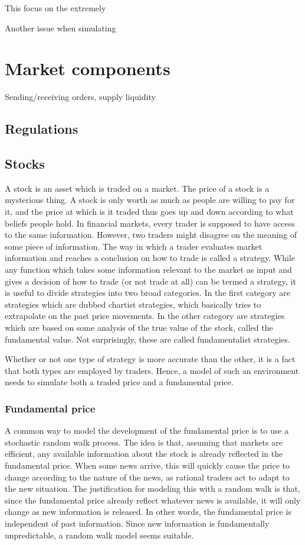 This focus on the extremely 

Another issue when simulating 





\section{Market components}
Sending/receiving orders, supply liquidity
\subsection{Regulations}

\subsection{Stocks}
A stock is an asset which is traded on a market. The price of a stock is a mysterious thing. A stock is only worth as much as people are willing to pay for it, and the price at which is it traded thus goes up and down according to what beliefs people hold. In financial markets, every trader is supposed to have access to the same information. However, two traders might disagree on the meaning of some piece of information. The way in which a trader evaluates market information and reaches a conclusion on how to trade is called a strategy. While any function which takes some information relevant to the market as input and gives a decision of how to trade (or not trade at all) can be termed a strategy, it is useful to divide strategies into two broad categories. In the first category are strategies which are dubbed chartist strategies, which basically tries to extrapolate on the past price movements. In the other category are strategies which are based on some analysis of the true value of the stock, called the fundamental value. Not surprisingly, these are called fundamentalist strategies. 

Whether or not one type of strategy is more accurate than the other, it is a fact that both types are employed by traders. Hence, a model of such an environment needs to simulate both a traded price and a fundamental price. 

\subsubsection{Fundamental price}

A common way to model the development of the fundamental price is to use a stochastic random walk process. The idea is that, assuming that markets are efficient, any available information about the stock is already reflected in the fundamental price. When some news arrive, this will quickly cause the price to change according to the nature of the news, as rational traders act to adapt to the new situation. The justification for modeling this with a random walk is that, since the fundamental price already reflect whatever news is available, it will only change as new information is released. In other words, the fundamental price is independent of past information. Since new information is fundamentally unpredictable, a random walk model seems suitable. 

